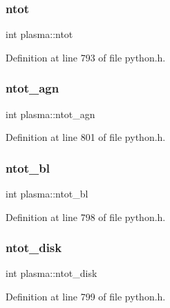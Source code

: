 \subsubsection{\texorpdfstring{ntot}{ntot}}
{\footnotesize\ttfamily int plasma\+::ntot}



Definition at line 793 of file python.\+h.

\mbox{\label{structplasma_aacb5d70931f73523be11b5bb9bb051a6}} 
\subsubsection{\texorpdfstring{ntot\+\_\+agn}{ntot\_agn}}
{\footnotesize\ttfamily int plasma\+::ntot\+\_\+agn}



Definition at line 801 of file python.\+h.

\mbox{\label{structplasma_aec5dcc811c48f5b8f8d195accbdb7813}} 
\subsubsection{\texorpdfstring{ntot\+\_\+bl}{ntot\_bl}}
{\footnotesize\ttfamily int plasma\+::ntot\+\_\+bl}



Definition at line 798 of file python.\+h.

\mbox{\label{structplasma_a0c76211532161bfdd92ccde2b4aacffd}} 
\subsubsection{\texorpdfstring{ntot\+\_\+disk}{ntot\_disk}}
{\footnotesize\ttfamily int plasma\+::ntot\+\_\+disk}



Definition at line 799 of file python.\+h.

\mbox{\label{structplasma_a2e85980821d61738e7b5b6455604066b}} 
